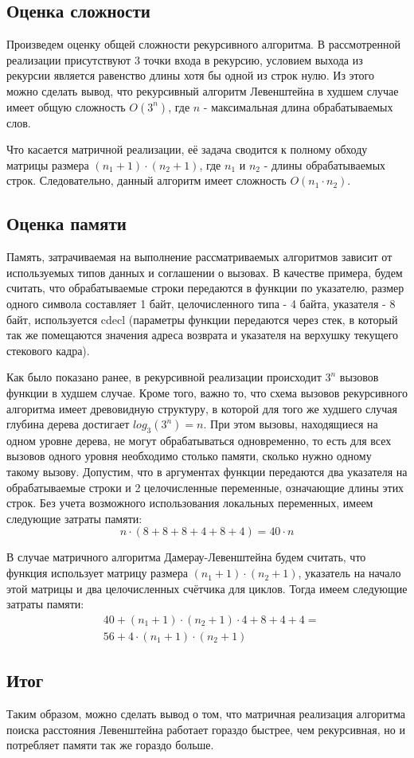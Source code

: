 \subsection{Оценка сложности}
Произведем оценку общей сложности рекурсивного алгоритма. В рассмотренной реализации присутствуют 3 точки входа в рекурсию, условием выхода из рекурсии является равенство длины хотя бы одной из строк нулю. Из этого можно сделать вывод, что рекурсивный алгоритм Левенштейна в худшем случае имеет общую сложность \(O(3^n)\), где \(n\) - максимальная длина обрабатываемых слов.

Что касается матричной реализации, её задача сводится к полному обходу матрицы размера \((n_1+1)\cdot{}(n_2+1)\), где \(n_1\) и \(n_2\) - длины обрабатываемых строк. Следовательно, данный алгоритм имеет сложность \(O(n_1\cdot{}n_2)\).

\subsection{Оценка памяти}
Память, затрачиваемая на выполнение рассматриваемых алгоритмов зависит от используемых типов данных и соглашении о вызовах. В качестве примера, будем считать, что обрабатываемые строки передаются в функции по указателю, размер одного символа составляет 1 байт, целочисленного типа - 4 байта, указателя - 8 байт, используется cdecl (параметры функции передаются через стек, в который так же помещаются значения адреса возврата и указателя на верхушку текущего стекового кадра).

Как было показано ранее, в рекурсивной реализации происходит \(3^n\) вызовов функции в худшем случае. Кроме того, важно то, что схема вызовов рекурсивного алгоритма имеет древовидную структуру, в которой для того же худшего случая глубина дерева достигает \(log_3(3^n) = n\). При этом вызовы, находящиеся на одном уровне дерева, не могут обрабатываться одновременно, то есть для всех вызовов одного уровня необходимо столько памяти, сколько нужно одному такому вызову. Допустим, что в аргументах функции передаются два указателя на обрабатываемые строки и 2 целочисленные переменные, означающие длины этих строк. Без учета возможного использования локальных переменных, имеем следующие затраты памяти:
\begin{equation}
    n \cdot{} (8+8 + 8+4 + 8+4) = 40 \cdot n
\end{equation}

В случае матричного алгоритма Дамерау-Левенштейна будем считать, что функция использует матрицу размера \((n_1+1)\cdot{}(n_2+1)\), указатель на начало этой матрицы и два целочисленных счётчика для циклов. Тогда имеем следующие затраты памяти:
\begin{equation}
    \begin{split}
    & 40 + (n_1+1)\cdot{}(n_2+1)\cdot{}4 + 8 + 4 + 4 = \\
    & 56 + 4\cdot{}(n_1+1)\cdot{}(n_2+1)
    \end{split}
\end{equation}

\subsection{Итог}
Таким образом, можно сделать вывод о том, что матричная реализация алгоритма поиска расстояния Левенштейна работает гораздо быстрее, чем рекурсивная, но и потребляет памяти так же гораздо больше.

